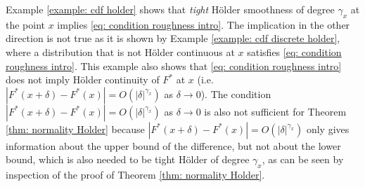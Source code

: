 \begin{remark}
    Example \ref{example: cdf holder} shows that \textit{tight} Hölder smoothness of degree $\gamma_x$ at the point $x$ implies \eqref{eq: condition roughness intro}. The implication in the other direction is not true as it is shown by Example \ref{example: cdf discrete holder}, where a distribution that is not Hölder continuous at $x$ satisfies \eqref{eq: condition roughness intro}. This example also shows that \eqref{eq: condition roughness intro} does not imply Hölder continuity of $F^*$ at $x$ (i.e.\ $|F^*(x+\delta) - F^*(x)| = O(|\delta|^{\gamma_x})$ as $\delta \rightarrow 0$). The condition $|F^*(x+\delta) - F^*(x)| = O(|\delta|^{\gamma_x})$ as $\delta \rightarrow 0$ is also not sufficient for Theorem \ref{thm: normality Holder} because $|F^*(x+\delta) - F^*(x)| = O(|\delta|^{\gamma_x})$ only gives information about the upper bound of the difference, but not about the lower bound, which is also needed to be tight Hölder of degree $\gamma_x$, as can be seen by inspection of the proof of Theorem \ref{thm: normality Holder}.
\end{remark}

